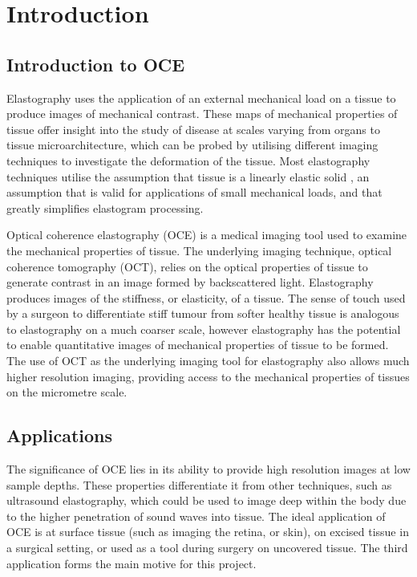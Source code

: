\chapter{Introduction}

\section{Introduction to OCE}
Elastography uses the application of an external mechanical load on a tissue to produce images of mechanical contrast. These maps of mechanical properties of tissue offer insight into the study of disease at scales varying from organs to tissue microarchitecture, which can be probed by utilising different imaging techniques to investigate the deformation of the tissue. Most elastography techniques utilise the assumption that tissue is a linearly elastic solid \cite{kennedy_review_2014}, an assumption that is valid for applications of small mechanical loads, and that greatly simplifies elastogram processing. 

Optical coherence elastography (OCE) is a medical imaging tool used to examine the mechanical properties of tissue. The underlying imaging technique, optical coherence tomography (OCT), relies on the optical properties of tissue to generate contrast in an image formed by backscattered light. Elastography produces images of the stiffness, or elasticity, of a tissue. The sense of touch used by a surgeon to differentiate stiff tumour from softer healthy tissue is analogous to elastography on a much coarser scale, however elastography has the potential to enable quantitative images of mechanical properties of tissue to be formed. The use of OCT as the underlying imaging tool for elastography also allows much higher resolution imaging, providing access to the mechanical properties of tissues on the micrometre scale. 

\section{Applications}
The significance of OCE lies in its ability to provide high resolution images at low sample depths. These properties differentiate it from other techniques, such as ultrasound elastography, which could be used to image deep within the body due to the higher penetration of sound waves into tissue. The ideal application of OCE is at surface tissue (such as imaging the retina, or skin), on excised tissue in a surgical setting, or used as a tool during surgery on uncovered tissue. The third application forms the main motive for this project.

